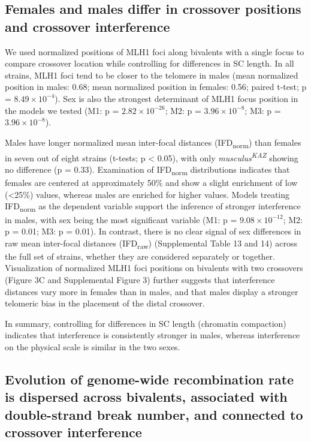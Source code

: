 \documentclass[
]{article}
\begin{document}
\hypertarget{females-and-males-differ-in-crossover-positions-and-crossover-interference}{%
\subsection{Females and males differ in crossover positions and
crossover
interference}\label{females-and-males-differ-in-crossover-positions-and-crossover-interference}}

We used normalized positions of MLH1 foci along bivalents with a single
focus to compare crossover location while controlling for differences in
SC length. In all strains, MLH1 foci tend to be closer to the telomere
in males (mean normalized position in males: 0.68; mean normalized
position in females: 0.56; paired t-test; p =
\ensuremath{8.49\times 10^{-4}}). Sex is also the strongest determinant
of MLH1 focus position in the models we tested (M1: p =
\ensuremath{2.82\times 10^{-26}}; M2: p =
\ensuremath{3.96\times 10^{-8}}; M3: p =
\ensuremath{3.96\times 10^{-8}}).

Males have longer normalized mean inter-focal distances
(IFD\textsubscript{norm}) than females in seven out of eight strains
(t-tests; p \textless{} 0.05), with only
\emph{musculus\textsuperscript{KAZ}} showing no difference (p = 0.33).
Examination of IFD\textsubscript{norm} distributions indicates that
females are centered at approximately 50\% and show a slight enrichment
of low (\textless25\%) values, whereas males are enriched for higher
values. Models treating IFD\textsubscript{norm} as the dependent
variable support the inference of stronger interference in males, with
sex being the most significant variable (M1: p =
\ensuremath{9.08\times 10^{-12}}; M2: p = 0.01; M3: p = 0.01). In
contrast, there is no clear signal of sex differences in raw mean
inter-focal distances (IFD\textsubscript{raw}) (Supplemental Table 13
and 14) across the full set of strains, whether they are considered
separately or together. Visualization of normalized MLH1 foci positions
on bivalents with two crossovers (Figure 3C and Supplemental Figure 3)
further suggests that interference distances vary more in females than
in males, and that males display a stronger telomeric bias in the
placement of the distal crossover.

In summary, controlling for differences in SC length (chromatin
compaction) indicates that interference is consistently stronger in
males, whereas interference on the physical scale is similar in the two
sexes.

\hypertarget{evolution-of-genome-wide-recombination-rate-is-dispersed-across-bivalents-associated-with-double-strand-break-number-and-connected-to-crossover-interference}{%
\subsection{Evolution of genome-wide recombination rate is dispersed
across bivalents, associated with double-strand break number, and
connected to crossover
interference}\label{evolution-of-genome-wide-recombination-rate-is-dispersed-across-bivalents-associated-with-double-strand-break-number-and-connected-to-crossover-interference}}
\end{document}
